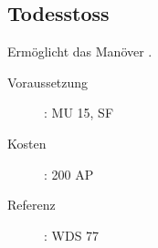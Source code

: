 \subsection{Todesstoss}
\label{sf.todesstoss}
Ermöglicht das Manöver .
\begin{description}
    \item[Voraussetzung]:
        MU 15, SF 
    \item [Kosten]:
        200 AP
    \item [Referenz]:
        WDS 77
\end{description}
